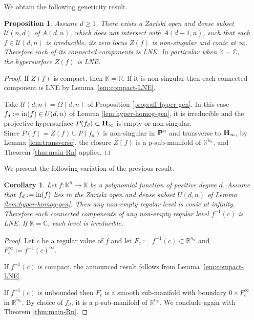 \documentclass[11pt]{amsart}
\newtheorem{corollary}[theorem]{Corollary}
\newtheorem{proposition}[theorem]{Proposition}
\newcommand{\field}[1]{\mathbb{#1}}
\newcommand{\C}{\field{C}}
\newcommand{\K}{\field{K}}
\newcommand{\R}{\field{R}}
\newcommand{\bH}{{\bf H}}
\newcommand{\bP}{{\bf P}}
\newcommand{\cU}{\mathcal{U}}
\newcommand{\ini}{{\rm in}}
\newcommand{\Kn}{{\K^n}}
\newcommand{\Omg}{\Omega}
\newcommand{\Zbar}{\overline{Z}}
\numberwithin{equation}{section}
\numberwithin{equation}{section}
\begin{document}
\bigskip
We obtain the following 
genericity result.
%
%
\begin{proposition}\label{prop:hyper-gen-LNE}
Assume $d\geq 1$.
There exists a Zariski open and dense subset $\cU(n,d)$ of $A(d,n)$, which 
does not intersect with $A(d-1,n)$, such that each $f \in  \cU(d,n)$
is irreducible, its zero locus $Z(f)$ is non-singular and conic at
$\infty$. Therefore each of its connected components is LNE.
In particular when $\K =\C$, the hypersurface $Z(f)$ is LNE.
\end{proposition}
%
%
\begin{proof}
If $Z(f)$ is compact, then $\K = \R$. If it is non-singular then each 
connected component is LNE by Lemma \ref{lem:compact-LNE}.

Take $\cU(d,n) = \Omg(d,n)$ of Proposition \ref{prop:aff-hyper-gen}.
In this case $f_d :=\ini(f) \in U(d,n)$ of Lemma \ref{lem:hyper-homog-gen}, 
it is irreducible and the projective hypersurface $P(f_d) \subset \bH_\infty$
is empty or non-singular. 
\\
Since $P(f) = Z(f) \cup P(f_d)$ is non-singular in $\bP^n$ and transverse 
to $\bH_\infty$, by Lemma \ref{lem:transverse}, the closure 
$\Zbar(f)$ is a p-sub-manifold of $\overline{\R^{n_\K}}$, and Theorem 
\ref{thm:main-Rn} applies.
\end{proof}
%
%
We present the following variation of the previous result.
%
%
\begin{corollary}\label{cor:generic-level-LNE}  
Let $f:\Kn \to \K$ be a polynomial function of positive degree $d$.
Assume that $f_d := \ini(f)$ lies in the Zariski open and dense 
subset $U(d,n)$ of Lemma \ref{lem:hyper-homog-gen}. Then any non-empty 
regular level is conic at infinity. Therefore each connected 
components of any non-empty regular level $f^{-1}(c)$ is LNE. 
If $\K =\C$, each level is irreducible.
\end{corollary}
%
%
\begin{proof}
Let $c$ be a regular value of $f$ and let $F_c := \overline{f^{-1}(c)}\subset
\overline{\R^{n_\K}}$ and $F_c^\infty := f^{-1}(c)^\infty$.

If $f^{-1}(c)$ is compact, the announced result follows 
from Lemma \ref{lem:compact-LNE}.

If $f^{-1}(c)$ is unbounded then $F_c$ is a smooth sub-manifold with boundary 
$0\times F_c^\infty$ in $\overline{\R^{n_\K}}$. By choice of $f_d$, it
is a p-sub-manifold of $\overline{\R^{n_\K}}$. We conclude again
with Theorem 
\ref{thm:main-Rn}.
\end{proof}
%
%
\end{document}
